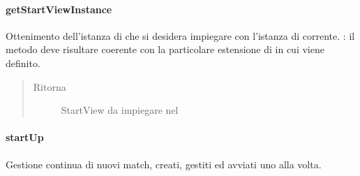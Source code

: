 \documentclass[letterpaper,10pt,italian,openany,oneside]{sphinxmanual}
\begin{document}
\paragraph{getStartViewInstance}
\label{\detokenize{test/it/unicam/cs/pa/mastermind/gamecore/MainManager:getstartviewinstance}}

\begin{fulllineitems}
\label{\detokenize{test/it/unicam/cs/pa/mastermind/gamecore/MainManager:it.unicam.cs.pa.mastermind.gamecore.MainManager.getStartViewInstance()}}
Ottenimento dell’istanza di  che si desidera impiegare con l’istanza di  corrente. : il metodo deve risultare coerente con la particolare estensione di  in cui viene definito.
\begin{quote}\begin{description}
\item[{Ritorna}] \leavevmode
StartView da impiegare nel 

\end{description}\end{quote}

\end{fulllineitems}



\paragraph{startUp}
\label{\detokenize{test/it/unicam/cs/pa/mastermind/gamecore/MainManager:startup}}

\begin{fulllineitems}
\label{\detokenize{test/it/unicam/cs/pa/mastermind/gamecore/MainManager:it.unicam.cs.pa.mastermind.gamecore.MainManager.startUp()}}
Gestione continua di nuovi match, creati, gestiti ed avviati uno alla volta.

\end{fulllineitems}
\end{document}
